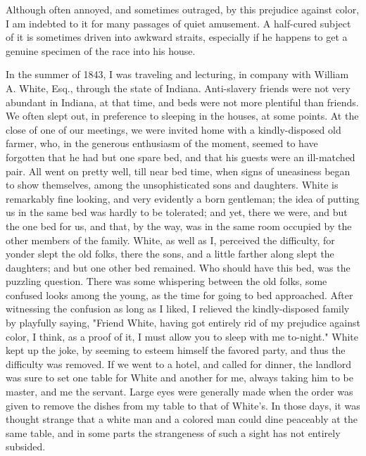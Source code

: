 Although often annoyed, and sometimes outraged, by this prejudice
against color, I am indebted to it for many passages of quiet amusement.
A half-cured subject of it is sometimes driven into awkward straits,
{\protect\hypertarget{401}{}{}}especially if he happens to get a genuine
specimen of the race into his house.

In the summer of 1843, I was traveling and lecturing, in company with
William A. White, Esq., through the state of Indiana. Anti-slavery
friends were not very abundant in Indiana, at that time, and beds were
not more plentiful than friends. We often slept out, in preference to
sleeping in the houses, at some points. At the close of one of our
meetings, we were invited home with a kindly-disposed old farmer, who,
in the generous enthusiasm of the moment, seemed to have forgotten that
he had but one spare bed, and that his guests were an ill-matched pair.
All went on pretty well, till near bed time, when signs of uneasiness
began to show themselves, among the unsophisticated sons and daughters.
White is remarkably fine looking, and very evidently a born gentleman;
the idea of putting us in the same bed was hardly to be tolerated; and
yet, there we were, and but the one bed for us, and that, by the way,
was in the same room occupied by the other members of the family. White,
as well as I, perceived the difficulty, for yonder slept the old folks,
there the sons, and a little farther along slept the daughters; and but
one other bed remained. Who should have this bed, was the puzzling
question. There was some whispering between the old folks, some confused
looks among the young, as the time for going to bed approached. After
witnessing the confusion as long as I liked, I relieved the
kindly-disposed family by playfully saying, "Friend White, having got
entirely rid of my prejudice against color, I think, as a proof of it, I
{\protect\hypertarget{402}{}{}}must allow you to sleep with me
to-night." White kept up the joke, by seeming to esteem himself the
favored party, and thus the difficulty was removed. If we went to a
hotel, and called for dinner, the landlord was sure to set one table for
White and another for me, always taking him to be master, and me the
servant. Large eyes were generally made when the order was given to
remove the dishes from my table to that of White's. In those days, it
was thought strange that a white man and a colored man could dine
peaceably at the same table, and in some parts the strangeness of such a
sight has not entirely subsided.

